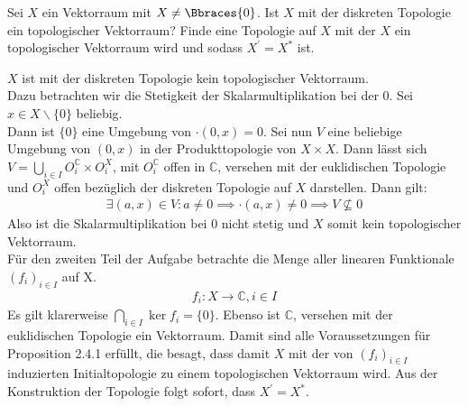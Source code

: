 \begin{exercise}

Sei $X$ ein Vektorraum mit $X \neq \Bbraces{0}$. Ist $X$ mit der diskreten Topologie ein topologischer Vektorraum?
Finde eine Topologie auf $X$ mit der $X$ ein topologischer Vektorraum wird und sodass $X^\prime = X^\ast$ ist.

\end{exercise}

\begin{solution}
$X$ ist mit der diskreten Topologie kein topologischer Vektorraum. \\
Dazu betrachten wir die Stetigkeit der Skalarmultiplikation bei der $0$.
Sei $x \in X\backslash\{0\}$ beliebig. \\
Dann ist $\{0\}$ eine Umgebung von $\cdot(0,x) = 0$.
Sei nun $V$ eine beliebige Umgebung von $(0,x)$ in der Produkttopologie von $X \times X$.
Dann lässt sich $V = \bigcup_{i \in I}O_i^{\mathbb{C}}\times O_i^X$, mit
$O_i^{\mathbb{C}}$ offen in $\mathbb{C}$, versehen mit der euklidischen Topologie
und $O_i^X$ offen bezüglich der diskreten Topologie auf $X$ darstellen.
Dann gilt:
\begin{align*}
  \exists (a,x) \in V: a \neq 0 \implies \cdot(a,x) \neq 0 \implies V \nsubseteq {0}
\end{align*}
Also ist die Skalarmultiplikation bei 0 nicht stetig und $X$ somit kein topologischer
Vektorraum.
\\
Für den zweiten Teil der Aufgabe betrachte die Menge aller linearen Funktionale $(f_i)_{i \in I}$ auf X.
\begin{align*}
  f_i: X \rightarrow \mathbb{C}, i \in I
\end{align*}
Es gilt klarerweise $\bigcap_{i\in I}\ker f_i = \{0\}$.
Ebenso ist $\mathbb{C}$, versehen mit der euklidischen Topologie ein Vektorraum.
Damit sind alle Voraussetzungen für Proposition 2.4.1 erfüllt, die besagt, dass
damit $X$ mit der von $(f_i)_{i\in I}$ induzierten Initialtopologie zu einem topologischen Vektorraum wird.
Aus der Konstruktion der Topologie folgt sofort, dass $X^\prime = X^\ast$.
\end{solution}
